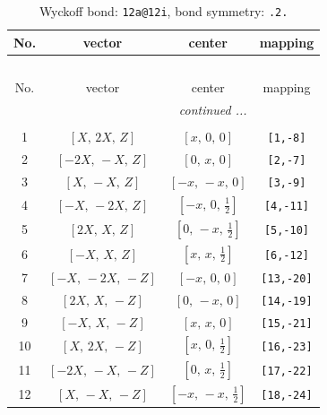 \documentclass[fleqn,8pt]{jsarticle}
\begin{document}
\begin{longtable}{cccc}
\caption{Wyckoff bond: {\tt 12a@12i}, bond symmetry: {\tt .2.}}
 \\
 \hline \hline
No. & vector & center & mapping \\ \hline \endfirsthead

\multicolumn{3}{l}{\tablename\ \thetable{}} \\
 \hline \hline
No. & vector & center & mapping \\ \hline \endhead

 \hline \hline
\multicolumn{3}{r}{\footnotesize\it continued ...} \\ \endfoot

 \hline \hline
\multicolumn{3}{r}{} \\ \endlastfoot

1 & $\left[ X,\, 2 X,\, Z \right]$ & $\left[ x,\, 0,\, 0 \right]$ & {\tt [1,-8]} \\ \hline
2 & $\left[ - 2 X,\, - X,\, Z \right]$ & $\left[ 0,\, x,\, 0 \right]$ & {\tt [2,-7]} \\ \hline
3 & $\left[ X,\, - X,\, Z \right]$ & $\left[ - x,\, - x,\, 0 \right]$ & {\tt [3,-9]} \\ \hline
4 & $\left[ - X,\, - 2 X,\, Z \right]$ & $\left[ - x,\, 0,\, \frac{1}{2} \right]$ & {\tt [4,-11]} \\ \hline
5 & $\left[ 2 X,\, X,\, Z \right]$ & $\left[ 0,\, - x,\, \frac{1}{2} \right]$ & {\tt [5,-10]} \\ \hline
6 & $\left[ - X,\, X,\, Z \right]$ & $\left[ x,\, x,\, \frac{1}{2} \right]$ & {\tt [6,-12]} \\ \hline
7 & $\left[ - X,\, - 2 X,\, - Z \right]$ & $\left[ - x,\, 0,\, 0 \right]$ & {\tt [13,-20]} \\ \hline
8 & $\left[ 2 X,\, X,\, - Z \right]$ & $\left[ 0,\, - x,\, 0 \right]$ & {\tt [14,-19]} \\ \hline
9 & $\left[ - X,\, X,\, - Z \right]$ & $\left[ x,\, x,\, 0 \right]$ & {\tt [15,-21]} \\ \hline
10 & $\left[ X,\, 2 X,\, - Z \right]$ & $\left[ x,\, 0,\, \frac{1}{2} \right]$ & {\tt [16,-23]} \\ \hline
11 & $\left[ - 2 X,\, - X,\, - Z \right]$ & $\left[ 0,\, x,\, \frac{1}{2} \right]$ & {\tt [17,-22]} \\ \hline
12 & $\left[ X,\, - X,\, - Z \right]$ & $\left[ - x,\, - x,\, \frac{1}{2} \right]$ & {\tt [18,-24]} \\
\end{longtable}
\renewcommand{\arraystretch}{1.2}
\end{document}
